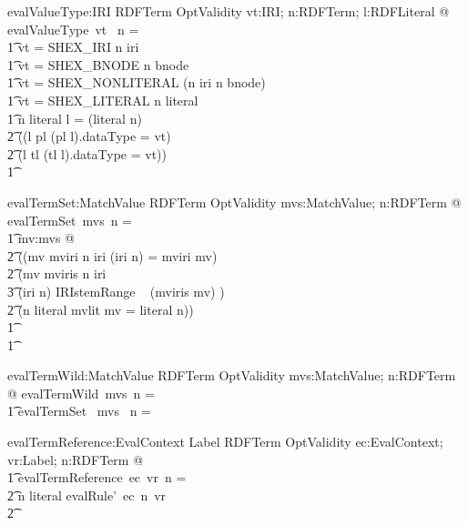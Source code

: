 \begin{gendef}
   evalValueType:IRI \pfun RDFTerm \pfun OptValidity
\where
   \forall vt:IRI; n:RDFTerm; l:RDFLiteral @ evalValueType~vt~ n = \\
\t1 \IF vt = SHEX\_IRI \land  n \in \ran iri \THEN \pass \\
\t1 \ELSE \IF vt = SHEX\_BNODE \land  n \in \ran bnode \THEN \pass \\
\t1 \ELSE \IF vt = SHEX\_NONLITERAL \land  (n \in \ran iri \lor n \in \ran bnode) \THEN \pass \\
\t1 \ELSE \IF vt = SHEX\_LITERAL \land  n \in \ran literal \THEN \pass \\
\t1 \ELSE \IF n \in \ran literal \land l = (literal \entryFor n) \land \\
\t2 ((l \in \ran pl \land (pl \entryFor l).dataType = vt) \lor \\
\t2  (l \in \ran tl \land (tl \entryFor l).dataType = vt)) \THEN \pass \\
\t1 \ELSE \fail
\end{gendef}
		

\begin{gendef}
   evalTermSet:\power MatchValue \pfun RDFTerm \pfun OptValidity
\where
   \forall mvs:\power MatchValue; n:RDFTerm @ evalTermSet~mvs~n = \\
\t1	\IF \exists mv:mvs @ \\
\t2 ((mv \in \ran mviri \land n \in \ran iri \land (iri \entryFor n) = mviri \entryFor mv) \lor \\
\t2  (mv \in \ran mviris \land n \in \ran iri \land  \\
\t3 (iri \entryFor n) \in IRIstemRange ~ (mviris \entryFor mv) ) \lor \\
\t2  (n \in \ran literal \land mvlit \entryFor mv = literal \entryFor n)) \\
\t1 \THEN \pass \\
\t1 \ELSE \fail
\end{gendef}
		

\begin{gendef}
   evalTermWild:\power MatchValue \fun RDFTerm \fun OptValidity
\where
   \forall mvs:\power MatchValue; n:RDFTerm @ evalTermWild~mvs~n = \\
\t1 \IF evalTermSet~ mvs~ n = \pass \THEN \fail \ELSE \pass
\end{gendef}
		

\begin{gendef}
   evalTermReference:EvalContext \pfun Label \pfun RDFTerm \pfun OptValidity
\where
\forall ec:EvalContext; vr:Label; n:RDFTerm @ \\ 
\t1	evalTermReference~ec~vr~n = \\
\t2		\IF n \notin \ran literal \THEN evalRule'~ec~n~vr \\
\t2		\ELSE \fail
\end{gendef}
		

